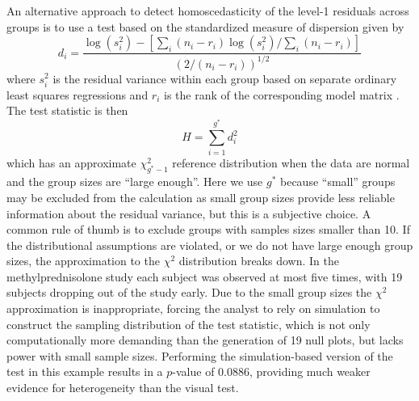 \documentclass[12pt]{article} %
\newcommand{\alnote}[1]{\todo[inline,color=green!40]{#1}} %
\newcommand{\hhnote}[1]{\todo[inline,color=orange!40]{#1}}
\begin{document}
An alternative approach to detect homoscedasticity of the level-1 residuals across groups is to use a test based on the standardized measure of dispersion given by
%
\begin{equation}\label{eq:d}
	d_i = \frac{\log\left( s_i^2 \right) - \left[ \sum_i (n_i - r_i) \log\left( s_i^2 \right) / \sum_i  (n_i - r_i) \right]}{\left(2 / (n_i - r_i)\right)^{1/2}}
\end{equation}
%
where $s_i^2$ is the residual variance within each group based on separate ordinary least squares regressions and $r_i$ is the rank of the corresponding model matrix  \citep{Raudenbush:2002}. The test statistic is then
%
\begin{equation}
	H = \sum_{i=1}^{g^*} d_i^2
\end{equation}
%
which has an approximate $\chi^2_{g^*-1}$ reference distribution when the data are normal and the group sizes are ``large enough''. Here we use $g^*$ because ``small'' groups may be excluded from the calculation as small group sizes provide less reliable information about the residual variance, but this is a subjective choice. A common rule of thumb is to exclude groups with samples sizes smaller than 10. If the distributional assumptions are violated, or we do not have large enough group sizes,  the approximation to the $\chi^2$ distribution breaks down. In the methylprednisolone study each subject was observed at most five times, with 19 subjects dropping out of the study early. Due to the small group sizes the $\chi^2$ approximation is inappropriate, forcing the analyst to rely on simulation to construct the sampling distribution of the test statistic, which is not only computationally more demanding than the generation of 19 null plots, but lacks power with small sample sizes. Performing the simulation-based version of the test in this example results in a $p$-value of 0.0886, providing much weaker evidence for heterogeneity than the visual test. 

%
\end{document}
